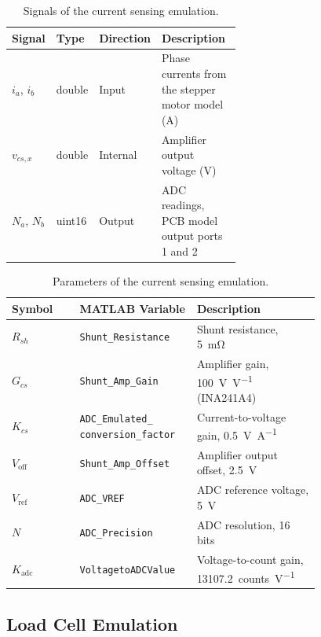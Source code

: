 \begin{table}[htbp]
	\centering
	\caption{Signals of the current sensing emulation.}
	\vspace{4pt}
	\label{tab:adc_signals}
	\begin{tabular}{ll>{\raggedright\arraybackslash}p{0.13\linewidth}>{\raggedright\arraybackslash}p{0.45\linewidth}}
		\hline
		Signal & Type & Direction & Description \\
		\hline
		$i_a$, $i_b$ & double & Input  & Phase currents from the stepper motor model (\si{\ampere}) \\
		$v_{cs,x}$   & double & Internal & Amplifier output voltage (\si{\volt}) \\
		$N_a$, $N_b$ & uint16 & Output & ADC readings, PCB model output ports 1 and 2 \\
		\hline
	\end{tabular}
\end{table}

\begin{table}[htbp]
	\centering
	\caption{Parameters of the current sensing emulation.}
	\vspace{4pt}
	\label{tab:adc_params}
	\begin{tabular}{l>{\raggedright\arraybackslash}p{0.38\linewidth}>{\raggedright\arraybackslash}p{0.4\linewidth}}
		\hline
		Symbol & MATLAB Variable & Description \\
		\hline
		$R_{sh}$ & \texttt{Shunt\_Resistance} & Shunt resistance, \SI{5}{\milli\ohm} \\
		$G_{cs}$ & \texttt{Shunt\_Amp\_Gain} & Amplifier gain, \SI{100}{\volt\per\volt} (INA241A4) \\
		$K_{cs}$ & \texttt{ADC\_Emulated\_} \texttt{conversion\_factor} & Current-to-voltage gain, \SI{0.5}{\volt\per\ampere} \\
		$V_{\mathrm{off}}$ & \texttt{Shunt\_Amp\_Offset} & Amplifier output offset, \SI{2.5}{\volt} \\
		$V_{\mathrm{ref}}$ & \texttt{ADC\_VREF} & ADC reference voltage, \SI{5}{\volt} \\
		$N$ & \texttt{ADC\_Precision} & ADC resolution, 16 bits \\
		$K_{\mathrm{adc}}$ & \texttt{VoltagetoADCValue} & Voltage-to-count gain, \SI{13107.2}{counts\per\volt} \\
		\hline
	\end{tabular}
\end{table}
\subsection{Load Cell Emulation}\label{sec:loadCellModel}

